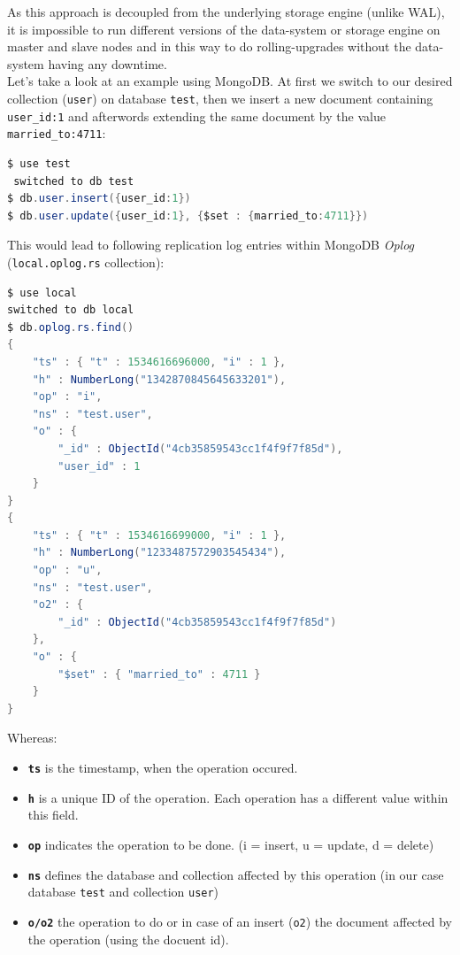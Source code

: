 {As this approach is decoupled from the underlying storage engine (unlike WAL), it is impossible to run different versions of the data-system or storage engine on master and slave nodes and in this way to do rolling-upgrades without the data-system having any downtime.\\

Let's take a look at an example using MongoDB. At first we switch to our desired collection (\lstinline{user}) on database \lstinline{test}, then we insert a new document containing \lstinline{user_id:1} and afterwords extending the same document by the value \lstinline{married_to:4711}:

\begin{lstlisting}[aboveskip=2ex, belowskip=2ex,emphstyle=\underbar, breaklines=true,frame=none,numbers=none,xleftmargin=0.01\textwidth,xrightmargin=0.01\textwidth,showstringspaces=false,language=java]
$ use test
 switched to db test
$ db.user.insert({user_id:1})
$ db.user.update({user_id:1}, {$set : {married_to:4711}})
\end{lstlisting}

This would lead to following replication log entries within MongoDB \textit{Oplog} (\lstinline{local.oplog.rs} collection):
\begin{lstlisting}[aboveskip=2ex, belowskip=2ex,emphstyle=\underbar, breaklines=true,frame=none,numbers=none,xleftmargin=0.01\textwidth,xrightmargin=0.01\textwidth,showstringspaces=false,language=java]
$ use local
switched to db local
$ db.oplog.rs.find()
{ 	
	"ts" : { "t" : 1534616696000, "i" : 1 }, 
	"h" : NumberLong("1342870845645633201"), 
	"op" : "i", 
	"ns" : "test.user", 
	"o" : { 
		"_id" : ObjectId("4cb35859543cc1f4f9f7f85d"), 
		"user_id" : 1 
	} 
}
{ 	
	"ts" : { "t" : 1534616699000, "i" : 1 }, 
	"h" : NumberLong("1233487572903545434"), 
	"op" : "u", 
	"ns" : "test.user", 
	"o2" : {
	 	"_id" : ObjectId("4cb35859543cc1f4f9f7f85d") 
	}, 
  	"o" : { 
  		"$set" : { "married_to" : 4711 } 
  	} 
}
\end{lstlisting}

Whereas: 
\begin{itemize}
\item \textbf{\lstinline{ts}} is the timestamp, when the operation occured.
\item \textbf{\lstinline{h}} is a unique ID of the operation. Each operation has a different value within this field.
\item \textbf{\lstinline{op}} indicates the operation to be done. (i = insert, u = update, d = delete)
\item \textbf{\lstinline{ns}} defines the database and collection affected by this operation (in our case database \lstinline{test} and collection \lstinline{user})
\item \textbf{\lstinline{o/o2}} the operation to do or in case of an insert (\lstinline{o2}) the document affected by the operation (using the docuent id).\\
\end{itemize}

}
